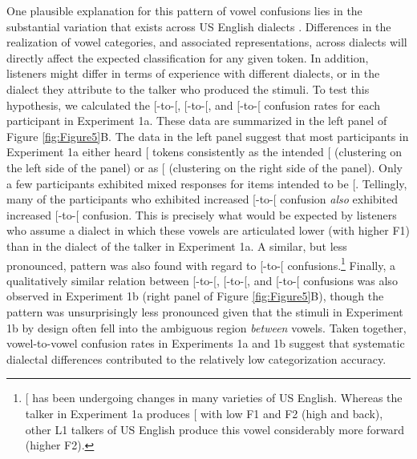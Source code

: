 \documentclass[preprint]{JASA}
\begin{document}
One plausible explanation for this pattern of vowel confusions lies in the substantial variation that exists across US English dialects \citep{atlasnae}. Differences in the realization of vowel categories, and associated representations, across dialects will directly affect the expected classification for any given token. In addition, listeners might differ in terms of experience with different dialects, or in the dialect they attribute to the talker who produced the stimuli. To test this hypothesis, we calculated the {[}\textipa{I}{]}-to-{[}\textipa{E}{]}, {[}\textipa{E}{]}-to-{[}\textipa{ae}{]}, and {[}\textipa{u}{]}-to-{[}\textipa{U}{]} confusion rates for each participant in Experiment 1a. These data are summarized in the left panel of Figure \ref{fig:Figure5}B. The data in the left panel suggest that most participants in Experiment 1a either heard {[}\textipa{I}{]} tokens consistently as the intended {[}\textipa{I}{]} (clustering on the left side of the panel) or as {[}\textipa{E}{]} (clustering on the right side of the panel). Only a few participants exhibited mixed responses for items intended to be {[}\textipa{I}{]}. Tellingly, many of the participants who exhibited increased {[}\textipa{I}{]}-to-{[}\textipa{E}{]} confusion \emph{also} exhibited increased {[}\textipa{E}{]}-to-{[}\textipa{ae}{]} confusion. This is precisely what would be expected by listeners who assume a dialect in which these vowels are articulated lower (with higher F1) than in the dialect of the talker in Experiment 1a. A similar, but less pronounced, pattern was also found with regard to {[}\textipa{u}{]}-to-{[}\textipa{U}{]} confusions.\footnote{{[}\textipa{u}{]} has been undergoing changes in many varieties of US English. Whereas the talker in Experiment 1a produces {[}\textipa{u}{]} with low F1 and F2 (high and back), other L1 talkers of US English produce this vowel considerably more forward (higher F2).} Finally, a qualitatively similar relation between {[}\textipa{I}{]}-to-{[}\textipa{E}{]}, {[}\textipa{E}{]}-to-{[}\textipa{ae}{]}, and {[}\textipa{u}{]}-to-{[}\textipa{U}{]} confusions was also observed in Experiment 1b (right panel of Figure \ref{fig:Figure5}B), though the pattern was unsurprisingly less pronounced given that the stimuli in Experiment 1b by design often fell into the ambiguous region \emph{between} vowels. Taken together, vowel-to-vowel confusion rates in Experiments 1a and 1b suggest that systematic dialectal differences contributed to the relatively low categorization accuracy.
\end{document}

